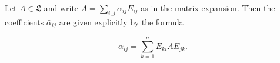 Let $A \in \mathfrak{L}$ and write $A = \sum_{i,j} \bar{\alpha}_{ij} E_{ij}$ as in the matrix expansion. Then the coefficients $\bar{\alpha}_{ij}$ are given explicitly by the formula

$$\bar{\alpha}_{ij} = \sum_{k=1}^n E_{ki} A E_{jk}.$$
